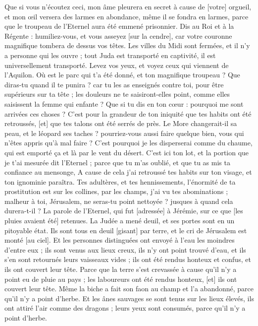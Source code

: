 \begin{multicols}{2}
Que si vous n'écoutez ceci, mon âme pleurera en secret à cause de [votre] orgueil, et mon œil versera des larmes en abondance, même il se fondra en larmes, parce que le troupeau de l'Eternel aura été emmené prisonnier.
Dis au Roi et à la Régente : humiliez-vous, et vous asseyez [sur la cendre], car votre couronne magnifique tombera de dessus vos têtes.
Les villes du Midi sont fermées, et il n'y a personne qui les ouvre ; tout Juda est transporté en captivité, il est universellement transporté.
Levez vos yeux, et voyez ceux qui viennent de l'Aquilon. Où est le parc qui t'a été donné, et ton magnifique troupeau ?
Que diras-tu quand il te punira ? car tu les as enseignés contre toi, pour être supérieurs sur ta tête ; les douleurs ne te saisiront-elles point, comme elles saisissent la femme qui enfante ?
Que si tu dis en ton cœur : pourquoi me sont arrivées ces choses ? C'est pour la grandeur de ton iniquité que tes habits ont été retroussés, [et] que tes talons ont été serrés de près.
Le More changerait-il sa peau, et le léopard ses taches ? pourriez-vous aussi faire quelque bien, vous qui n'êtes appris qu'à mal faire ?
C'est pourquoi je les disperserai comme du chaume, qui est emporté ça et là par le vent du désert.
C'est ici ton lot, et la portion que je t'ai mesurée dit l'Eternel ; parce que tu m'as oublié, et que tu as mis ta confiance au mensonge,
A cause de cela j'ai retroussé tes habits sur ton visage, et ton ignominie paraîtra.
Tes adultères, et tes hennissements, l'énormité de ta prostitution est sur les collines, par les champs, j'ai vu tes abominations ; malheur à toi, Jérusalem, ne seras-tu point nettoyée ? jusques à quand cela durera-t-il ?
\VerseOne{}La parole de l'Eternel, qui fut [adressée] à Jérémie, sur ce que [les pluies avaient été] retenues.
La Judée a mené deuil, et ses portes sont en un pitoyable état. Ils sont tous en deuil [gisant] par terre, et le cri de Jérusalem est monté [au ciel].
Et les personnes distinguées ont envoyé à l'eau les moindres d'entre eux ; ils sont venus aux lieux creux, ils n'y ont point trouvé d'eau, et ils s'en sont retournés leurs vaisseaux vides ; ils ont été rendus honteux et confus, et ils ont couvert leur tête.
Parce que la terre s'est crevassée à cause qu'il n'y a point eu de pluie au pays ; les laboureurs ont été rendus honteux, [et] ils ont couvert leur tête.
Même la biche a fait son faon au champ et l'a abandonné, parce qu'il n'y a point d'herbe.
Et les ânes sauvages se sont tenus sur les lieux élevés, ils ont attiré l'air comme des dragons ; leurs yeux sont consumés, parce qu'il n'y a point d'herbe.

\end{multicols}
